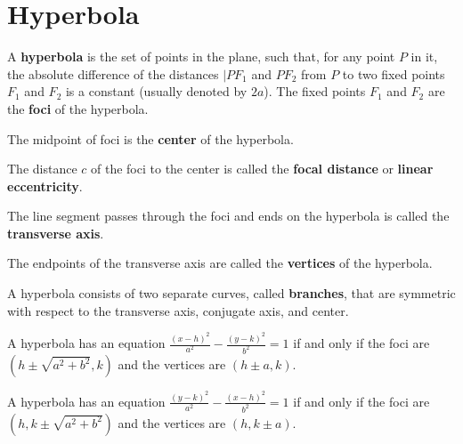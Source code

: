 \newpage

\section{Hyperbola}

\begin{definition}
A \textbf{hyperbola} is the set of points in the plane, such that, for any point $P$ in it, the absolute difference of the distances $|PF_1$ and $PF_2$ from $P$ to two fixed points $F_1$ and $F_2$ is a constant (usually denoted by $2a$). The fixed points $F_1$ and $F_2$ are the \textbf{foci} of the hyperbola.

The midpoint of foci is the \textbf{center} of the hyperbola.

The distance $c$ of the foci to the center is called the \textbf{focal distance} or \textbf{linear eccentricity}.

The line segment passes through the foci and ends on the hyperbola is called the \textbf{transverse axis}. 

The endpoints of the transverse axis are called the \textbf{vertices} of the hyperbola.



A hyperbola consists of two separate curves, called \textbf{branches}, that are symmetric with respect to the transverse axis, conjugate axis, and center. 
\end{definition}


\begin{theorem}
    A hyperbola has an equation $\frac{(x-h)^2}{a^2}-\frac{(y-k)^2}{b^2}=1$ if and only if the foci are $(h\pm \sqrt{a^2+b^2}, k)$ and the vertices are $(h\pm a, k)$.
\end{theorem}

\begin{theorem}
    A hyperbola has an equation $\frac{(y-k)^2}{a^2}-\frac{(x-h)^2}{b^2}=1$ if and only if the foci are $(h, k\pm \sqrt{a^2+b^2})$ and the vertices are $(h, k\pm a)$.
\end{theorem}


